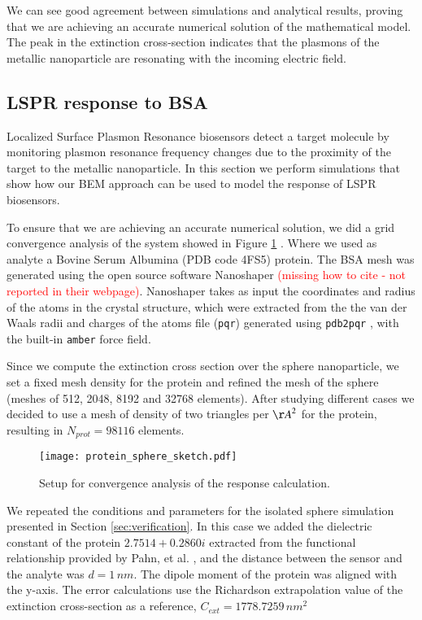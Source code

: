 We can see good agreement between simulations and analytical results, proving
that we are achieving an accurate numerical solution of the mathematical model. The 
peak in the extinction cross-section indicates that the plasmons of the metallic
nanoparticle are resonating with the incoming electric field.


\subsection{LSPR response to BSA} \label{sec:lspr_response}

Localized Surface Plasmon Resonance biosensors detect a target molecule by monitoring
plasmon resonance frequency changes due to the proximity of the target to the metallic
nanoparticle. In this section we perform simulations that show how our BEM approach
can be used to model the response of LSPR biosensors.

To ensure that we are achieving an accurate numerical solution, we did a grid 
convergence analysis of the system showed in Figure \ref{fig:setup_conv} . Where
we used as analyte a Bovine Serum Albumina (PDB code 4FS5) protein. The BSA mesh
was generated using the open source software Nanoshaper \textcolor{red}{(missing how to cite - not
reported in their webpage)}. Nanoshaper takes as input the coordinates and radius
of the atoms in the crystal structure, which were extracted from the the van der
Waals radii and charges of the atoms file (\texttt{pqr}) generated using 
\texttt{pdb2pqr} \cite{Dolinsky04}, with the built-in \texttt{amber} force field.

Since we compute the extinction cross section over the sphere nanoparticle, we 
set a fixed mesh density for the protein and refined the mesh of the
sphere (meshes of 512, 2048, 8192 and 32768 elements). After studying different 
cases we decided to use a mesh of density of two triangles per ${\AA}^2$ for 
the protein, resulting in $N_{prot} = 98116$ elements. 


\begin{figure}[h] %
   \centering
   \texttt{[image: protein\_sphere\_sketch.pdf]} 
   \caption{Setup for convergence analysis of the response calculation.}
   \label{fig:setup_conv}
\end{figure}

We repeated the conditions and parameters for the isolated sphere simulation
presented in Section \ref{sec:verification}. In this case we added the 
dielectric constant of the protein $2.7514 + 0.2860i$ extracted from the 
functional relationship provided by Pahn, et al. \cite{PahnETal2013}, and the 
distance between the sensor and the analyte was $d=1 \, nm$.  The dipole moment 
of the protein was aligned with the y-axis. The error calculations
use the Richardson extrapolation value of the extinction cross-section as a
reference, $C_{ext}= 1778.7259 \, nm^2$



